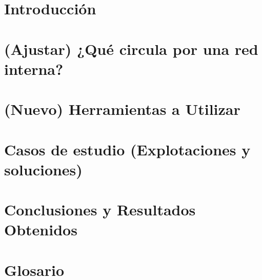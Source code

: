 \documentclass[12pt,twoside]{book}
\begin{document}
\nocite{*}

\frontmatter\pagestyle{empty}

\begin{titlepage}

\end{titlepage}

\begin{titlepage}

\end{titlepage}



\setcounter{page}{1}



\tableofcontents


\mainmatter\pagestyle{headings}


\chapter{Introducci\'on} \setcounter{page}{1}
    \label{capIntro}





\chapter{(Ajustar) ¿Qué circula por una red interna? } \setcounter{page}{1}
    \label{capImp}


\chapter{(Nuevo) Herramientas a Utilizar} \setcounter{page}{1}
    \label{capDesc}


\chapter{Casos de estudio (Explotaciones y soluciones)} \setcounter{page}{1}
    \label{capImp}







\chapter{Conclusiones y Resultados Obtenidos}
    \label{capConc}




\appendix
\chapter{Glosario}





%
\end{document}
